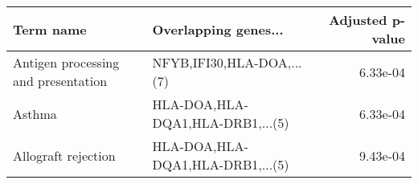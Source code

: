 \begin{tabular}{llr}
\toprule
                          Term name &             Overlapping genes... &  Adjusted p-value \\
\midrule
Antigen processing and presentation &        NFYB,IFI30,HLA-DOA,...(7) &          6.33e-04 \\
                             Asthma & HLA-DOA,HLA-DQA1,HLA-DRB1,...(5) &          6.33e-04 \\
                Allograft rejection & HLA-DOA,HLA-DQA1,HLA-DRB1,...(5) &          9.43e-04 \\
\bottomrule
\end{tabular}

